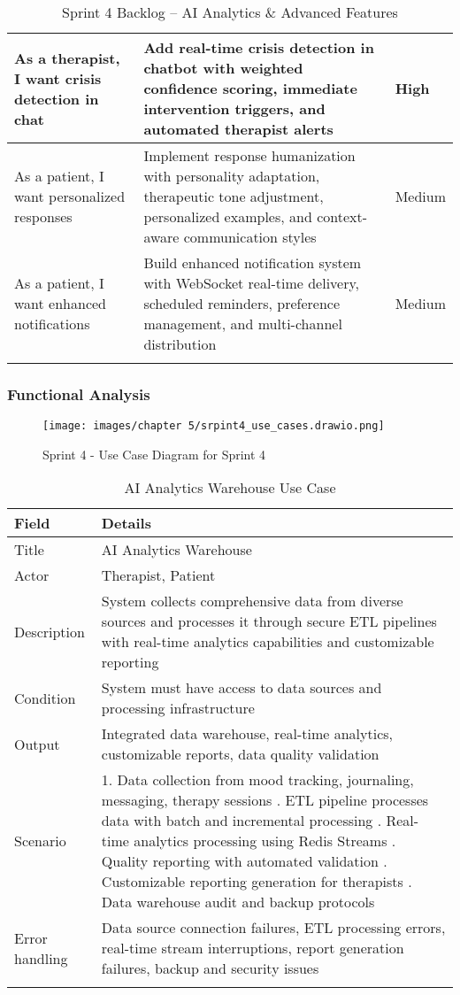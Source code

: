 \begin{longtable}{|p{4.2cm}|p{7.2cm}|p{2.2cm}|}
\hline
As a therapist, I want crisis detection in chat & Add real-time crisis detection in chatbot with weighted confidence scoring, immediate intervention triggers, and automated therapist alerts & High \\
\hline
As a patient, I want personalized responses & Implement response humanization with personality adaptation, therapeutic tone adjustment, personalized examples, and context-aware communication styles & Medium \\
\hline
As a patient, I want enhanced notifications & Build enhanced notification system with WebSocket real-time delivery, scheduled reminders, preference management, and multi-channel distribution & Medium \\
\caption{Sprint 4 Backlog -- AI Analytics \& Advanced Features}
\end{longtable}

\subsubsection{Functional Analysis}
\begin{figure}[H]
    \centering
    \texttt{[image: images/chapter 5/srpint4\_use\_cases.drawio.png]}
    \caption{Sprint 4 - Use Case Diagram for Sprint 4}
    \label{fig:use_case_sprint4}
\end{figure}

\begin{longtable}{|p{3cm}|p{12cm}|}
\hline
\textbf{Field} & \textbf{Details} \\
\hline
Title & AI Analytics Warehouse \\
\hline
Actor & Therapist, Patient \\
\hline
Description & System collects comprehensive data from diverse sources and processes it through secure ETL pipelines with real-time analytics capabilities and customizable reporting \\
\hline
Condition & System must have access to data sources and processing infrastructure \\
\hline
Output & Integrated data warehouse, real-time analytics, customizable reports, data quality validation \\
\hline
Scenario & 1. Data collection from mood tracking, journaling, messaging, therapy sessions \newline 2. ETL pipeline processes data with batch and incremental processing \newline 3. Real-time analytics processing using Redis Streams \newline 4. Quality reporting with automated validation \newline 5. Customizable reporting generation for therapists \newline 6. Data warehouse audit and backup protocols \\
\hline
Error handling & Data source connection failures, ETL processing errors, real-time stream interruptions, report generation failures, backup and security issues \\
\hline
\caption{AI Analytics Warehouse Use Case}
\end{longtable}

